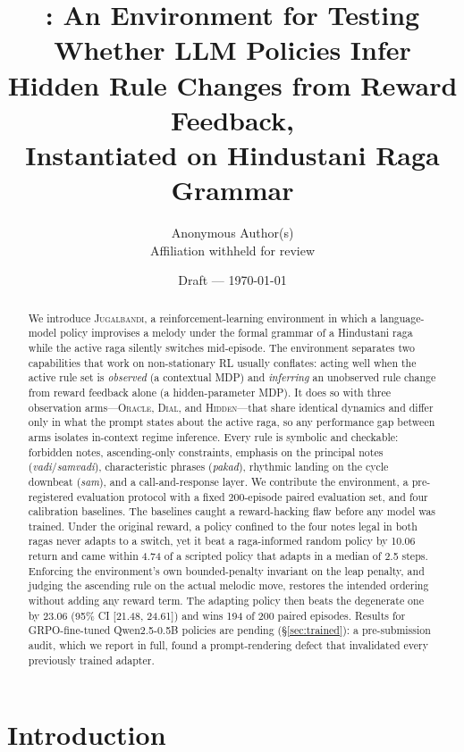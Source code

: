 \documentclass[11pt]{article}
\title{\env: An Environment for Testing Whether LLM Policies Infer\\Hidden Rule Changes from Reward Feedback,\\Instantiated on Hindustani Raga Grammar}
\author{Anonymous Author(s)\\\small Affiliation withheld for review}
\date{Draft --- \today}
\newcommand{\env}{\textsc{Jugalbandi}}
\newcommand{\hidden}{\textsc{Hidden}}
\newcommand{\dial}{\textsc{Dial}}
\newcommand{\oracle}{\textsc{Oracle}}
\newcommand{\sw}[1]{\textit{#1}}  %
\begin{document}
\maketitle

\begin{abstract}
We introduce \env{}, a reinforcement-learning environment in which a language-model policy improvises a melody under the formal grammar of a Hindustani raga while the active raga silently switches mid-episode. The environment separates two capabilities that work on non-stationary RL usually conflates: acting well when the active rule set is \emph{observed} (a contextual MDP) and \emph{inferring} an unobserved rule change from reward feedback alone (a hidden-parameter MDP). It does so with three observation arms---\oracle{}, \dial{}, and \hidden{}---that share identical dynamics and differ only in what the prompt states about the active raga, so any performance gap between arms isolates in-context regime inference. Every rule is symbolic and checkable: forbidden notes, ascending-only constraints, emphasis on the principal notes (\sw{vadi}/\sw{samvadi}), characteristic phrases (\sw{pakad}), rhythmic landing on the cycle downbeat (\sw{sam}), and a call-and-response layer. We contribute the environment, a pre-registered evaluation protocol with a fixed 200-episode paired evaluation set, and four calibration baselines. The baselines caught a reward-hacking flaw before any model was trained. Under the original reward, a policy confined to the four notes legal in both ragas never adapts to a switch, yet it beat a raga-informed random policy by 10.06 return and came within 4.74 of a scripted policy that adapts in a median of 2.5 steps. Enforcing the environment's own bounded-penalty invariant on the leap penalty, and judging the ascending rule on the actual melodic move, restores the intended ordering without adding any reward term. The adapting policy then beats the degenerate one by 23.06 (95\% CI [21.48, 24.61]) and wins 194 of 200 paired episodes. Results for GRPO-fine-tuned Qwen2.5-0.5B policies are pending (\S\ref{sec:trained}): a pre-submission audit, which we report in full, found a prompt-rendering defect that invalidated every previously trained adapter.
\end{abstract}

\section{Introduction}
\label{sec:intro}
\end{document}
